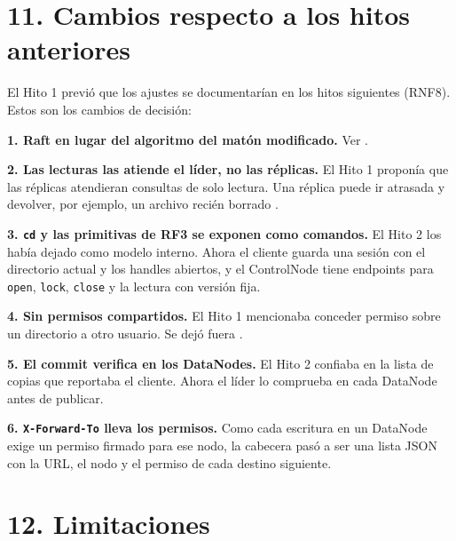 \documentclass[10pt]{article}
\begin{document}
\separador

\section{11. Cambios respecto a los hitos anteriores}

El Hito 1 previó que los ajustes se documentarían en los hitos siguientes (RNF8). Estos son los cambios de decisión:

\textbf{1. Raft en lugar del algoritmo del matón modificado.} Ver .

\textbf{2. Las lecturas las atiende el líder, no las réplicas.} El Hito 1 proponía que las réplicas atendieran consultas de solo lectura. Una réplica puede ir atrasada y devolver, por ejemplo, un archivo recién borrado .

\textbf{3. \texttt{cd} y las primitivas de RF3 se exponen como comandos.} El Hito 2 los había dejado como modelo interno. Ahora el cliente guarda una sesión con el directorio actual y los handles abiertos, y el ControlNode tiene endpoints para \texttt{open}, \texttt{lock}, \texttt{close} y la lectura con versión fija.

\textbf{4. Sin permisos compartidos.} El Hito 1 mencionaba conceder permiso sobre un directorio a otro usuario. Se dejó fuera .

\textbf{5. El commit verifica en los DataNodes.} El Hito 2 confiaba en la lista de copias que reportaba el cliente. Ahora el líder lo comprueba en cada DataNode antes de publicar.

\textbf{6. \texttt{X-Forward-To} lleva los permisos.} Como cada escritura en un DataNode exige un permiso firmado para ese nodo, la cabecera pasó a ser una lista JSON con la URL, el nodo y el permiso de cada destino siguiente.

\separador

\section{12. Limitaciones}
\end{document}
